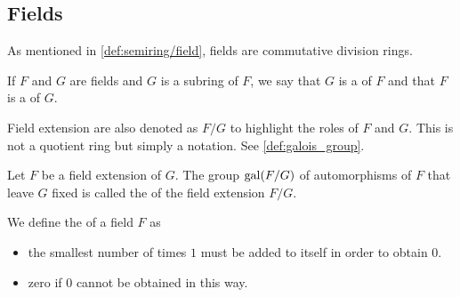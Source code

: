 \subsection{Fields}\label{subsec:fields}

\begin{definition}\label{def:field}
  As mentioned in \cref{def:semiring/field}, fields are commutative division rings.
\end{definition}

\begin{definition}\label{def:field_extension}
  If \( F \) and \( G \) are fields and \( G \) is a subring of \( F \), we say that \( G \) is a  of \( F \) and that \( F \) is a  of \( G \).

  Field extension are also denoted as \( F / G \) to highlight the roles of \( F \) and \( G \). This is not a quotient ring but simply a notation. See \cref{def:galois_group}.
\end{definition}

\begin{definition}\label{def:galois_group}\cite[124]{Knapp2016BAlg}
  Let \( F \) be a field extension of \( G \). The group \( \operatorname{gal}(F / G) \) of automorphisms of \( F \) that leave \( G \) fixed is called the  of the field extension \( F / G \).
\end{definition}

\begin{definition}\label{def:field_characteristic}
  We define the  of a field \( F \) as
  \begin{itemize}
    \item the smallest number of times \( 1 \) must be added to itself in order to obtain \( 0 \).
    \item zero if \( 0 \) cannot be obtained in this way.
  \end{itemize}
\end{definition}
